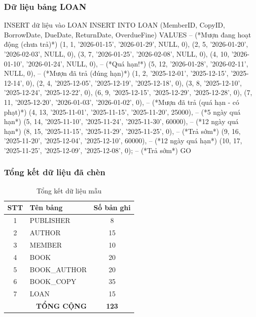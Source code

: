 \documentclass[12pt,a4paper]{article}
\begin{document}
\subsubsection{Dữ liệu bảng LOAN}

\begin{sqlcode}{INSERT dữ liệu vào LOAN}
INSERT INTO LOAN (MemberID, CopyID, BorrowDate, DueDate, ReturnDate, OverdueFine) VALUES
-- (*Mượn đang hoạt động (chưa trả)*)
(1, 1, '2026-01-15', '2026-01-29', NULL, 0),
(2, 5, '2026-01-20', '2026-02-03', NULL, 0),
(3, 7, '2026-01-25', '2026-02-08', NULL, 0),
(4, 10, '2026-01-10', '2026-01-24', NULL, 0),  -- (*Quá hạn!*)
(5, 12, '2026-01-28', '2026-02-11', NULL, 0),
-- (*Mượn đã trả (đúng hạn)*)
(1, 2, '2025-12-01', '2025-12-15', '2025-12-14', 0),
(2, 4, '2025-12-05', '2025-12-19', '2025-12-18', 0),
(3, 8, '2025-12-10', '2025-12-24', '2025-12-22', 0),
(6, 9, '2025-12-15', '2025-12-29', '2025-12-28', 0),
(7, 11, '2025-12-20', '2026-01-03', '2026-01-02', 0),
-- (*Mượn đã trả (quá hạn - có phạt)*)
(4, 13, '2025-11-01', '2025-11-15', '2025-11-20', 25000),  -- (*5 ngày quá hạn*)
(5, 14, '2025-11-10', '2025-11-24', '2025-11-30', 60000),  -- (*12 ngày quá hạn*)
(8, 15, '2025-11-15', '2025-11-29', '2025-11-25', 0),    -- (*Trả sớm*)
(9, 16, '2025-11-20', '2025-12-04', '2025-12-10', 60000), -- (*12 ngày quá hạn*)
(10, 17, '2025-11-25', '2025-12-09', '2025-12-08', 0);    -- (*Trả sớm*)
GO
\end{sqlcode}

\subsubsection{Tổng kết dữ liệu đã chèn}

\begin{table}[H]
\centering
\caption{Tổng kết dữ liệu mẫu}
\begin{tabular}{|c|l|c|}
\hline
\textbf{STT} & \textbf{Tên bảng} & \textbf{Số bản ghi} \\ \hline
1 & PUBLISHER & 8 \\ \hline
2 & AUTHOR & 15 \\ \hline
3 & MEMBER & 10 \\ \hline
4 & BOOK & 20 \\ \hline
5 & BOOK\_AUTHOR & 20 \\ \hline
6 & BOOK\_COPY & 35 \\ \hline
7 & LOAN & 15 \\ \hline
\multicolumn{2}{|r|}{\textbf{TỔNG CỘNG}} & \textbf{123} \\ \hline
\end{tabular}
\end{table}
\end{document}
